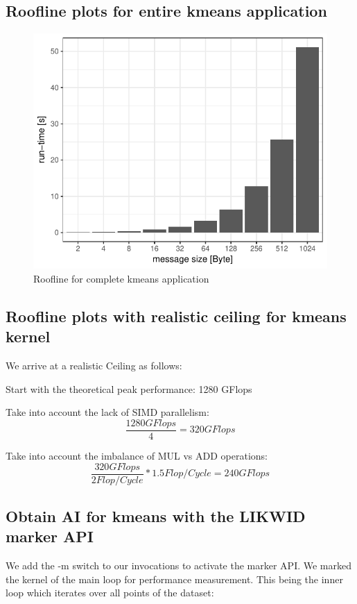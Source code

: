 \subsection{Roofline plots for entire kmeans application}

\begin{figure}[ht]
	\centering
	\includegraphics[width=.5\linewidth]{figures/runtime}
	\caption{Roofline for complete kmeans application}
	\label{fig:runtime}
\end{figure}

\subsection{Roofline plots with realistic ceiling for kmeans kernel}

We arrive at a realistic Ceiling as follows:

Start with the theoretical peak performance: 1280 GFlops

Take into account the lack of SIMD parallelism: 
$$\frac{1280 GFlops}{4} = 320 GFlops$$

Take into account the imbalance of MUL vs ADD operations:
$$\frac{320 GFlops}{2 Flop/Cycle} *1.5 Flop/Cycle = 240 GFlops$$

\subsection{Obtain AI for kmeans with the LIKWID marker API}

We add the -m switch to our invocations to activate the marker API.
We marked the kernel of the main loop for performance measurement.
This being the inner loop which iterates over all points of the dataset:

